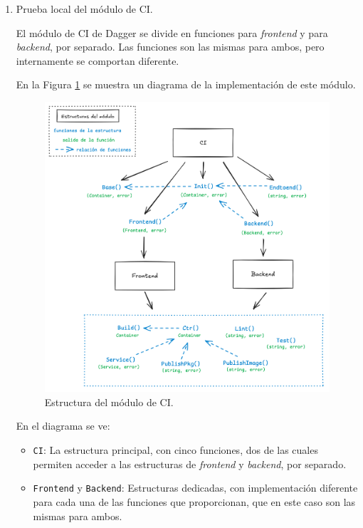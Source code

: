 \begin{enumerate}
  \item Prueba local del módulo de CI.

    El módulo de CI de Dagger se divide en funciones para \textit{frontend} y para \textit{backend}, por separado. Las funciones son las mismas para ambos, pero internamente se comportan diferente.

    En la Figura \ref{fig:ci_schema} se muestra un diagrama de la implementación de este módulo.

\begin{figure}
  \centerline{\includegraphics[width=13.5cm]{figuras/ci_schema}}
  \caption{Estructura del módulo de CI.}
  \label{fig:ci_schema}
\end{figure}

    En el diagrama se ve:
    \begin{itemize}
      \item \texttt{CI}: La estructura principal, con cinco funciones, dos de las cuales permiten acceder a las estructuras de \textit{frontend} y \textit{backend}, por separado.
      \item \texttt{Frontend} y \texttt{Backend}: Estructuras dedicadas, con implementación diferente para cada una de las funciones que proporcionan, que en este caso son las mismas para ambos.
    \end{itemize}


\end{enumerate}
